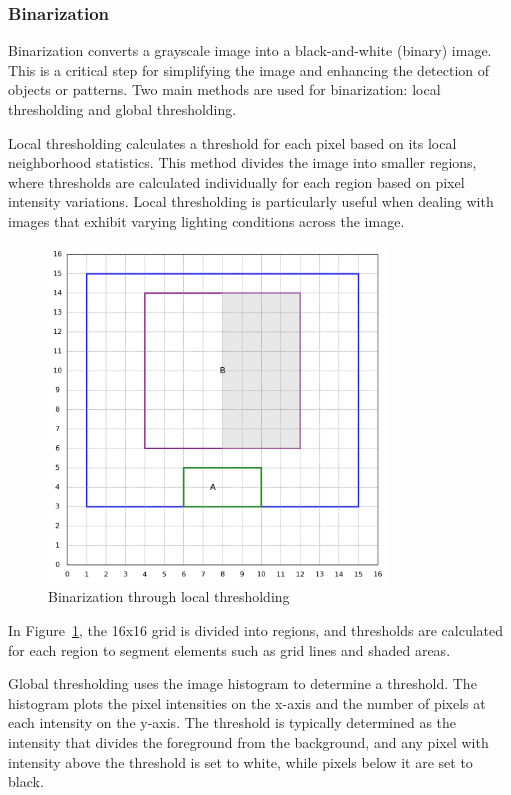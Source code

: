 \subsubsection{Binarization}
Binarization converts a grayscale image into a black-and-white (binary) image. This is a critical step for simplifying the image and enhancing the detection of objects or patterns. Two main methods are used for binarization: local thresholding and global thresholding.

Local thresholding calculates a threshold for each pixel based on its local neighborhood statistics. This method divides the image into smaller regions, where thresholds are calculated individually for each region based on pixel intensity variations. Local thresholding is particularly useful when dealing with images that exhibit varying lighting conditions across the image.

\begin{figure}[h!]
    \centering
    \includegraphics[width=0.8\textwidth]{content/images/localThresholding.png}
    \caption{Binarization through local thresholding}
    \label{fig:localThresholding}
\end{figure}

In Figure~\ref{fig:localThresholding}, the 16x16 grid is divided into regions, and thresholds are calculated for each region to segment elements such as grid lines and shaded areas.

Global thresholding uses the image histogram to determine a threshold. The histogram plots the pixel intensities on the x-axis and the number of pixels at each intensity on the y-axis. The threshold is typically determined as the intensity that divides the foreground from the background, and any pixel with intensity above the threshold is set to white, while pixels below it are set to black.

